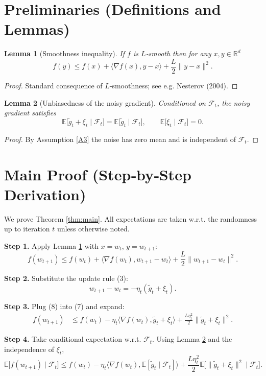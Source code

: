 \documentclass{article}
\newtheorem{lemma}{Lemma}
\newcommand{\EE}{\mathbb{E}}
\newcommand{\RR}{\mathbb{R}}
\begin{document}
\newpage
\section*{Preliminaries (Definitions and Lemmas)}
\begin{lemma}[Smoothness inequality]\label{lem:smooth}
If $f$ is $L$‑smooth then for any $x,y\in\RR^{d}$
\[
f(y)\le f(x)+\langle\nabla f(x),y-x\rangle+\frac{L}{2}\|y-x\|^{2}.
\tag{5}
\]
\end{lemma}
\begin{proof}
Standard consequence of $L$‑smoothness; see e.g. Nesterov (2004). \qedhere
\end{proof}

\begin{lemma}[Unbiasedness of the noisy gradient]\label{lem:unbiased}
Conditioned on $\mathcal{F}_t$, the noisy gradient satisfies
\[
\EE\!\bigl[\tilde g_t+\xi_t\mid\mathcal{F}_t\bigr]=\EE\!\bigl[\tilde g_t\mid\mathcal{F}_t\bigr],
\qquad
\EE\!\bigl[\xi_t\mid\mathcal{F}_t\bigr]=0.
\tag{6}
\]
\end{lemma}
\begin{proof}
By Assumption \ref{A3} the noise has zero mean and is independent of $\mathcal{F}_t$.
\qedhere
\end{proof}

\section*{Main Proof (Step‑by‑Step Derivation)}
We prove Theorem \ref{thm:main}.  
All expectations are taken w.r.t. the randomness up to iteration $t$ unless otherwise noted.

\noindent\textbf{Step 1.} Apply Lemma \ref{lem:smooth} with $x=w_t$, $y=w_{t+1}$:
\[
f(w_{t+1})\le f(w_t)+\langle\nabla f(w_t),w_{t+1}-w_t\rangle+\frac{L}{2}\|w_{t+1}-w_t\|^{2}.
\tag{7}
\]

\noindent\textbf{Step 2.} Substitute the update rule (3):
\[
w_{t+1}-w_t=-\eta_t(\tilde g_t+\xi_t).
\tag{8}
\]

\noindent\textbf{Step 3.} Plug (8) into (7) and expand:
\[
\begin{aligned}
f(w_{t+1})
&\le f(w_t)-\eta_t\langle\nabla f(w_t),\tilde g_t+\xi_t\rangle
+\frac{L\eta_t^{2}}{2}\|\tilde g_t+\xi_t\|^{2}.
\end{aligned}
\tag{9}
\]

\noindent\textbf{Step 4.} Take conditional expectation w.r.t. $\mathcal{F}_t$.
Using Lemma \ref{lem:unbiased} and the independence of $\xi_t$,
\[
\EE\!\bigl[f(w_{t+1})\mid\mathcal{F}_t\bigr]
\le f(w_t)-\eta_t\langle\nabla f(w_t),\EE[\tilde g_t\mid\mathcal{F}_t]\rangle
+\frac{L\eta_t^{2}}{2}\EE\!\bigl[\|\tilde g_t+\xi_t\|^{2}\mid\mathcal{F}_t\bigr].
\tag{10}
\]
\end{document}
